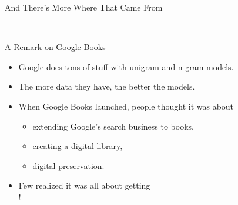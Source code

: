 \documentclass[professionalfonts, xcolor={usenames,svgnames,x11names,table}]{beamer}
\begin{document}
\begin{frame}{And There's More Where That Came From}
    \begin{center}
        \qquad
        \\
    \end{center}
\end{frame}


\begin{frame}{A Remark on Google Books}
	\begin{itemize}
		\item Google does tons of stuff with unigram and n-gram models.
		\item The more data they have, the better the models.
		\item When Google Books launched, people thought it was about
			\begin{itemize}
				\item extending Google's search business to books,
				\item creating a digital library,
				\item digital preservation.
			\end{itemize}
		\item Few realized it was all about getting\\
			  !
	\end{itemize}
\end{frame}
\end{document}
